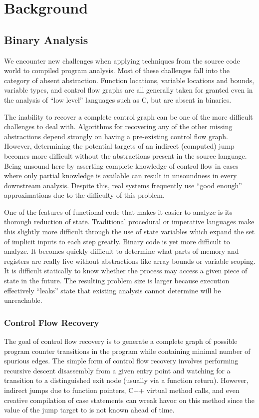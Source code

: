 \chapter{Background}
\label{chap:background}
\section{Binary Analysis}
We encounter new challenges when applying techniques from the source code world to compiled program analysis.
Most of these challenges fall into the category of absent abstraction.
Function locations, variable locations and bounds, variable types, and control flow graphs are all generally taken for granted even in the analysis of ``low level'' languages such as C, but are absent in binaries.

The inability to recover a complete control graph can be one of the more difficult challenges to deal with.
Algorithms for recovering any of the other missing abstractions depend strongly on having a pre-existing control flow graph\cite{vsa,bddbddb,smash,tie,bitr,wrappedintervals,ramalingam2000}.
However, determining the potential targets of an indirect (computed) jump becomes more difficult without the abstractions present in the source language.
Being unsound here by asserting complete knowledge of control flow in cases where only partial knowledge is available can result in unsoundness in every downstream analysis.
Despite this, real systems frequently use ``good enough'' approximations due to the difficulty of this problem.

One of the features of functional code that makes it easier to analyze is its thorough reduction of state.
Traditional procedural or imperative languages make this slightly more difficult through the use of state variables which expand the set of implicit inputs to each step greatly.
Binary code is yet more difficult to analyze.
It becomes quickly difficult to determine what parts of memory and registers are really live without abstractions like array bounds or variable scoping.
It is difficult statically to know whether the process may access a given piece of state in the future.
The resulting problem size is larger because execution effectively ``leaks'' state that existing analysis cannot determine will be unreachable.

\subsection{Control Flow Recovery}
\label{sec:cfg}
The goal of control flow recovery is to generate a complete graph of possible program counter transitions in the program while containing minimal number of spurious edges.
The simple form of control flow recovery involves performing recursive descent disassembly from a given entry point and watching for a transition to a distinguished exit node (usually via a function return).
However, indirect jumps due to function pointers, C++ virtual method calls, and even creative compilation of case statements can wreak havoc on this method since the value of the jump target to is not known ahead of time.


